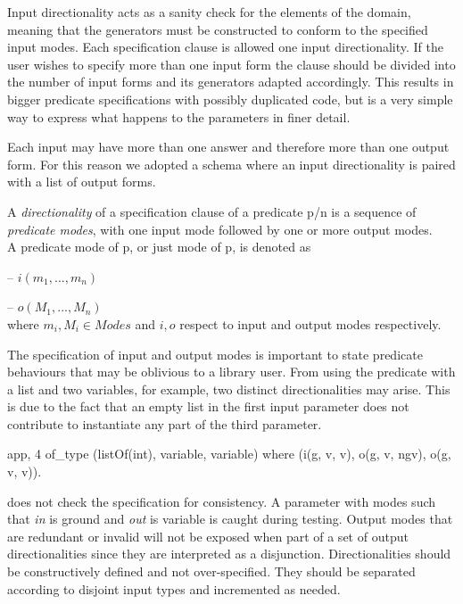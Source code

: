 Input directionality acts as a sanity check for the elements of the
domain, meaning that the generators must be constructed to conform to the
specified input modes.
%
Each specification clause is allowed one input directionality.
%
If the user wishes to specify more than one input form the clause should
be divided into the number of input forms and its generators adapted
accordingly.
%
This results in bigger predicate specifications with possibly
duplicated code, but is a very simple way to express what happens to the
parameters in finer detail.


Each input may have more than one answer and therefore more than one
output form.
%
For this reason we adopted a schema where an input directionality is
paired with a list of output forms.


\begin{definition}
\label{def:directionality}
A \emph{directionality} of a specification clause of a predicate
p/n is a sequence of \emph{predicate modes}, with one input mode
followed by one or more output modes.
\\
A predicate mode of p, or just mode of p, is denoted as

\;\;  -- $i(m_1, ..., m_n)$

\;\;  -- $o(M_1, ..., M_n)$
\\
where $m_i,M_i \in Modes$ and $i, o$ respect to input and output modes
respectively.
\end{definition}


The specification of input and output modes is important to state
predicate behaviours that may be oblivious to a library user.
%
From using the predicate  with a list and two variables, for
example, two distinct directionalities may arise.
%
This is due to the fact that an empty list in the first input parameter does
not contribute to instantiate any part of the third parameter.
%
\begin{yapcode}
 {app, 4} of_type (listOf(int), variable, variable)
    where (i(g, v, v), o(g, v, ngv), o(g, v, v)).
\end{yapcode}


\plqc{} does not check the specification for consistency. 
%
A parameter with modes such that \emph{in} is ground and \emph{out} is
variable is caught during testing.
%
Output modes that are redundant or invalid will not be exposed when part
of a set of output directionalities since they are interpreted as a
disjunction.
%
Directionalities should be constructively defined and not
over-specified.
%
They should be separated according to disjoint input types and
incremented as needed.




